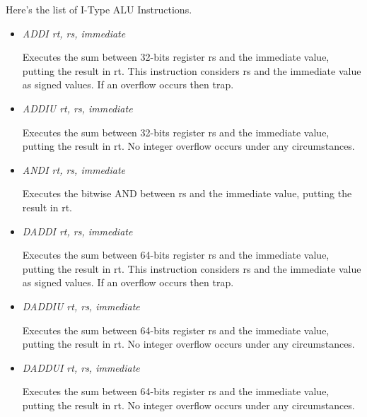 \documentclass[letterpaper,10pt,english]{sphinxmanual}
\begin{document}
Here's the list of I-Type ALU Instructions.
\begin{itemize}
\item {} 
\emph{ADDI rt, rs, immediate}

Executes the sum between 32-bits register rs and the immediate value, putting the result in rt.  This instruction considers rs and the immediate value as signed values.  If an overflow occurs then trap.

\item {} 
\emph{ADDIU rt, rs, immediate}

Executes the sum between 32-bits register rs and the immediate value, putting the result in rt.  No integer overflow occurs under any circumstances.

\end{itemize}
\begin{itemize}
\item {} 
\emph{ANDI rt, rs, immediate}

Executes the bitwise AND between rs and the immediate value, putting the result in rt.

\item {} 
\emph{DADDI rt, rs, immediate}

Executes the sum between 64-bits register rs and the immediate value, putting the result in rt.  This instruction considers rs and the immediate value as signed values.  If an overflow occurs then trap.

\item {} 
\emph{DADDIU rt, rs, immediate}

Executes the sum between 64-bits register rs and the immediate value, putting the result in rt.  No integer overflow occurs under any circumstances.

\end{itemize}
\begin{itemize}
\item {} 
\emph{DADDUI rt, rs, immediate}

Executes the sum between 64-bits register rs and the immediate value, putting the result in rt.  No integer overflow occurs under any circumstances.

\end{itemize}
\end{document}
